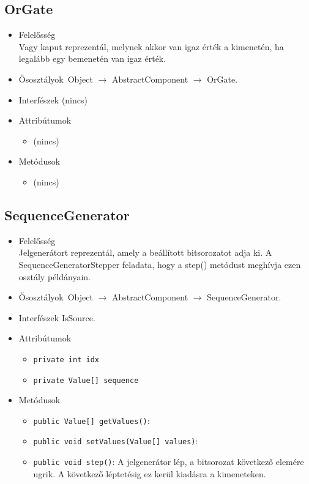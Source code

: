 \subsection{OrGate}
\begin{itemize}
\item Felelősség\\
Vagy kaput reprezentál, melynek akkor van igaz érték a kimenetén, ha legalább  egy bemenetén van igaz érték.
\item Ősosztályok\ Object $\rightarrow{}$ AbstractComponent $\rightarrow{}$ OrGate.
\item Interfészek (nincs)
\item Attribútumok $\ $
\begin{itemize}
\item (nincs)
\end{itemize}
\item Metódusok$\ $
\begin{itemize}
\item (nincs)
\end{itemize}
\end{itemize}

\subsection{SequenceGenerator}
\begin{itemize}
\item Felelősség\\
Jelgenerátort reprezentál, amely a beállított bitsorozatot adja ki. A  SequenceGeneratorStepper feladata, hogy a step() metódust meghívja ezen osztály  példányain.
\item Ősosztályok\ Object $\rightarrow{}$ AbstractComponent $\rightarrow{}$ SequenceGenerator.
\item Interfészek IsSource.
\item Attribútumok $\ $
\begin{itemize}
	\item \texttt{private int idx} 
	\item \texttt{private Value[] sequence} 
\end{itemize}
\item Metódusok$\ $
\begin{itemize}
	\item \texttt{public Value[] getValues()}: 
	\item \texttt{public void setValues(Value[] values)}: 
	\item \texttt{public void step()}: A jelgenerátor lép, a bitsorozat következő elemére ugrik. A következő léptetésig  ez kerül kiadásra a kimeneteken.
\end{itemize}
\end{itemize}


